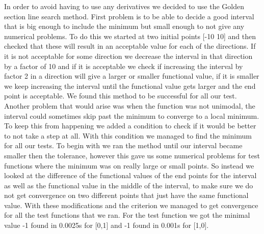 In order to avoid having to use any derivatives we decided to use the Golden section line search method. First problem is to be able to decide a good interval that is big enough to include the minimum but small enough to not give any numerical problems. To do this we started at two initial points [-10 10] and then checked that these will result in an acceptable value for each of the directions. If it is not acceptable for some direction we decrease the interval in that direction by a factor of 10 and if it is acceptable we check if increasing the interval by factor 2 in a direction will give a larger or smaller functional value, if  it is smaller we keep increasing the interval until the functional value gets larger and the end point is acceptable. We found this method to be successful for all our test. Another problem that would arise was when the function was not unimodal, the interval could sometimes skip past the minimum to converge to a local minimum. To keep this from happening we added a condition to check if it would be better to not take a step at all. With this condition we managed to find the minimum for all our tests. To begin with we ran the method until our interval became smaller then the tolerance, however this gave us some numerical problems for test functions where the minimum was on really large or small points. So instead we looked at the difference of the functional values of the end points for the interval as well as the functional value in the middle of the interval, to make sure we do not get convergence on two different points that just have the same functional value. With these modifications and the criterion we managed to get convergence for all the test functions that we ran. For the test function we got the minimal value -1 found in 0.0025s for [0,1] and -1 found in 0.001s for [1,0]. 
